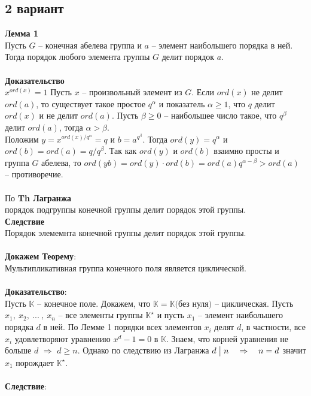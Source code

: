 	\subsection{2 вариант}
		\textbf{Лемма 1}\\
		Пусть $G$ -- конечная абелева группа и $a$ -- элемент наибольшего порядка в ней. Тогда порядок любого элемента группы $G$ делит порядок $a$.\\
		\\
		\textbf{Доказательство}\\ 
		$x^{ord(x)} = 1$ Пусть $x$ -- произвольный элемент из $G$. Если $ord(x)$ не делит $ord(a)$, то существует такое простое $q^\alpha$ и показатель  $\alpha \geq 1$, что $q$ делит $ord(x)$ и не делит $ord(a)$. Пусть $\beta \geq 0$ -- наибольшее число такое, что $q^\beta$ делит $ord(a)$, тогда $\alpha > \beta$.\\
		Положим $y = x^{ord(x) / q^\alpha} = q$ и $b = a^{q^{\beta}}$. Тогда $ord(y) = q^\alpha$ и $ord(b) = ord(a) = q / q^\beta$. Так как $ord(y)$ и $ord(b)$ взаимно просты и группа $G$ абелева, то $ord(yb) = ord(y) \cdot ord(b) = ord(a)q^{\alpha - \beta} > ord(a)$ -- противоречие.\\
		\\
		По \textbf{Th Лагранжа}\\ порядок подгруппы конечной группы делит порядок этой группы.\\ 
		\textbf{Следствие}\\ Порядок элемемнта конечной группы делит порядок этой группы.\\
		\\
		\textbf{Докажем Теорему}:\\ 
		Мультипликативная группа конечного поля является циклической.\\
		\\
		\textbf{Доказательство}:\\ 
		Пусть $\mathbb{K}$ -- конечное поле. Докажем, что $\mathbb{K} = \mathbb{K} \text{(без нуля)}$ -- циклическая. Пусть $x_1,\ x_2,\ ... \: ,\ x_n$ -- все элементы группы $\mathbb{K}^{\star}$ и пусть $x_1$ -- элемент наибольшего порядка $d$ в ней. По Лемме 1 порядки всех элементов $x_i$ делят $d$, в частности, все $x_i$ удовлетворяют уравнению $x^d - 1 = 0$ в $\mathbb{K}$. Знаем, что корней уравнения не больше $d$ $\Rightarrow$ $d \geq n$. Однако по следствию из Лагранжа $d \bigm| n \quad \Rightarrow \quad n = d$ значит $x_1$ порождает $\mathbb{K}^{\star}$.\\
		\\
		\textbf{Следствие}:\\ 
